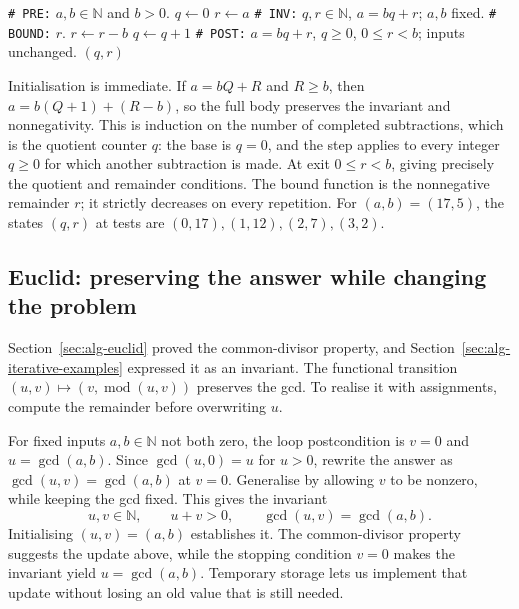 \begin{algorithm}[H]
\begin{algorithmic}[1]
\Statex \texttt{\# PRE:} $a,b\in\mathbb N$ and $b>0$.
\State $q\leftarrow0$
\State $r\leftarrow a$
\Statex \texttt{\# INV:} $q,r\in\mathbb N$, $a=bq+r$; $a,b$ fixed.
\Statex \texttt{\# BOUND:} $r$.
\State $r\leftarrow r-b$
\State $q\leftarrow q+1$
\EndWhile
\Statex \texttt{\# POST:} $a=bq+r$, $q\geq0$, $0\leq r<b$; inputs unchanged.
\State \Return $(q,r)$
\EndProcedure
\end{algorithmic}
\caption{Each repetition removes one more copy of the divisor.}
\end{algorithm}

Initialisation is immediate. If $a=bQ+R$ and $R\geq b$, then
$a=b(Q+1)+(R-b)$, so the full body preserves the invariant and nonnegativity.
This is induction on the number of completed subtractions, which is the
quotient counter $q$: the base is $q=0$, and the step applies to every
integer $q\geq0$ for which another subtraction is made.
At exit $0\leq r<b$, giving precisely the quotient and remainder conditions.
The bound function is the nonnegative remainder $r$; it strictly decreases on every repetition.
For $(a,b)=(17,5)$, the states $(q,r)$ at tests are
$(0,17),(1,12),(2,7),(3,2)$.

\subsection{Euclid: preserving the answer while changing the problem}

Section~\ref{sec:alg-euclid} proved the common-divisor property, and
Section~\ref{sec:alg-iterative-examples} expressed it as an invariant.
The functional transition $(u,v)\mapsto(v,\operatorname{mod}(u,v))$
preserves the gcd. To realise it with assignments, compute the remainder
before overwriting $u$.

For fixed inputs $a,b\in\mathbb N$ not both zero, the loop postcondition
is $v=0$ and $u=\gcd(a,b)$. Since $\gcd(u,0)=u$ for $u>0$,
rewrite the answer as $\gcd(u,v)=\gcd(a,b)$ at $v=0$.
Generalise by allowing $v$ to be nonzero, while keeping the gcd fixed.
This gives the invariant
\[
u,v\in\mathbb N,\qquad u+v>0,\qquad \gcd(u,v)=\gcd(a,b).
\]
Initialising $(u,v)=(a,b)$ establishes it. The common-divisor property
suggests the update above, while the stopping condition $v=0$ makes the
invariant yield $u=\gcd(a,b)$. Temporary storage lets us implement that
update without losing an old value that is still needed.

